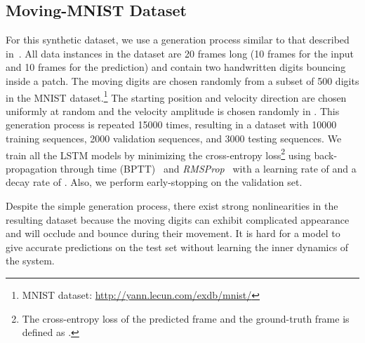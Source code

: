 \documentclass{article} \usepackage{amsmath}
\begin{document}
\subsection{Moving-MNIST Dataset}
For this synthetic dataset, we use a generation process similar to that described in~\cite{srivastava2015unsupervised}. All data instances in the dataset are 20 frames long (10 frames for the input and 10 frames for the prediction) and contain two handwritten digits bouncing inside a  patch. The moving digits are chosen randomly from a subset of 500 digits in the MNIST dataset.\footnote{MNIST dataset: \url{http://yann.lecun.com/exdb/mnist/}} The starting position and velocity direction are chosen uniformly at random and the velocity amplitude is chosen randomly in . This generation process is repeated 15000 times, resulting in a dataset with 10000 training sequences, 2000 validation sequences, and 3000 testing sequences. We train all the LSTM models by minimizing the cross-entropy loss\footnote{The cross-entropy loss of the predicted frame  and the ground-truth frame  is defined as .} using back-propagation through time (BPTT)~\cite{Bengio-et-al-2015-Book} and \emph{\mbox{RMSProp}}~\cite{tieleman2012lecture} with a learning rate of  and a decay rate of . Also, we perform early-stopping on the validation set.

Despite the simple generation process, there exist strong nonlinearities in the resulting dataset because the moving digits can exhibit complicated appearance and will occlude and bounce during their movement. It is hard for a model to give accurate predictions on the test set without learning the inner dynamics of the system.
\end{document}
